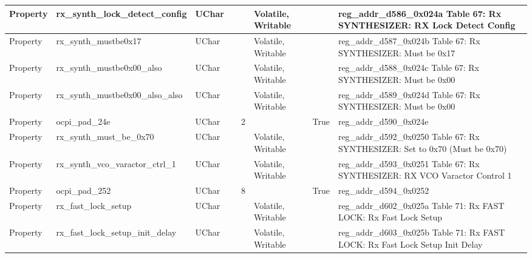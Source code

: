 \documentclass{article}
\begin{document}
\begin{scriptsize}
\begin{longtable}{|p{2cm}|p{5cm}|p{1cm}|p{2cm}|p{2cm}|p{1.75cm}|p{1.5cm}|p{5.1cm}|}
  \hline
  Property & rx\_synth\_lock\_detect\_config                          & UChar &                  &                  & Volatile,  Writable &         & reg\_addr\_d586\_0x024a Table 67: Rx SYNTHESIZER: RX Lock Detect Config \\
  \hline
  Property & rx\_synth\_mustbe0x17                                    & UChar &                  &                  & Volatile,  Writable &         & reg\_addr\_d587\_0x024b Table 67: Rx SYNTHESIZER: Must be 0x17 \\
  \hline
  Property & rx\_synth\_mustbe0x00\_also                              & UChar &                  &                  & Volatile,  Writable &         & reg\_addr\_d588\_0x024c Table 67: Rx SYNTHESIZER: Must be 0x00 \\
  \hline
  Property & rx\_synth\_mustbe0x00\_also\_also                        & UChar &                  &                  & Volatile,  Writable &         & reg\_addr\_d589\_0x024d Table 67: Rx SYNTHESIZER: Must be 0x00 \\
  \hline
  Property & ocpi\_pad\_24e                                           & UChar &                  & 2                &                     & True    & reg\_addr\_d590\_0x024e \\
  \hline
  Property & rx\_synth\_must\_be\_0x70                                & UChar &                  &                  & Volatile,  Writable &         & reg\_addr\_d592\_0x0250 Table 67: Rx SYNTHESIZER: Set to 0x70 (Must be 0x70) \\
  \hline
  Property & rx\_synth\_vco\_varactor\_ctrl\_1                        & UChar &                  &                  & Volatile,  Writable &         & reg\_addr\_d593\_0x0251 Table 67: Rx SYNTHESIZER: RX VCO Varactor Control 1 \\
  \hline
  Property & ocpi\_pad\_252                                           & UChar &                  & 8                &                     & True    & reg\_addr\_d594\_0x0252 \\
  \hline
  Property & rx\_fast\_lock\_setup                                    & UChar &                  &                  & Volatile,  Writable &         & reg\_addr\_d602\_0x025a Table 71: Rx FAST LOCK: Rx Fast Lock Setup \\
  \hline
  Property & rx\_fast\_lock\_setup\_init\_delay                       & UChar &                  &                  & Volatile,  Writable &         & reg\_addr\_d603\_0x025b Table 71: Rx FAST LOCK: Rx Fast Lock Setup Init Delay \\

\end{longtable}
\end{scriptsize}
\end{document}
